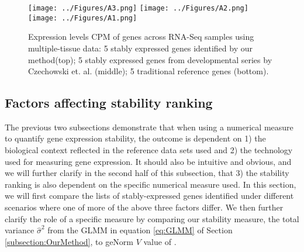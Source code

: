\documentclass[11pt, a4paper]{article}
\begin{document}
 \begin{figure}[H]
\begin{center}
	\texttt{[image: ../Figures/A3.png]}
	\texttt{[image: ../Figures/A2.png]}
	\texttt{[image: ../Figures/A1.png]}
	\caption{{\small{\label{expressinlevel1} Expression levels CPM of genes across RNA-Seq samples using multiple-tissue data: 5 stably expressed genes identified by our method(top)}; 5 stably expressed genes from developmental series by Czechowski et. al. (middle); 5 traditional reference genes (bottom).}}
\end{center}
\end{figure} 

\subsection{Factors affecting stability ranking}\label{section:stabilityMeasure}
The previous two subsections demonstrate that when using a numerical measure
to quantify gene expression stability, the outcome is dependent on 1) the
biological context reflected in the reference data sets used and 2) the
technology used for measuring gene expression. It should also be intuitive and
obvious, and we will further clarify in the second half of this subsection,
that 3) the stability ranking is also dependent on the specific numerical
measure used.  In this section, we will first compare the lists of
stably-expressed genes identified under different scenarios where one of more
of the above three factors differ.  We then further clarify the role of a
specific measure by comparing our stability measure, the total variance
$\hat\sigma^2$ from the GLMM in equation \ref{eq:GLMM} of Section \ref{subsection:OurMethod}, to geNorm $V$ value of \cite{vandesompele2002accurate}. 
\end{document}

